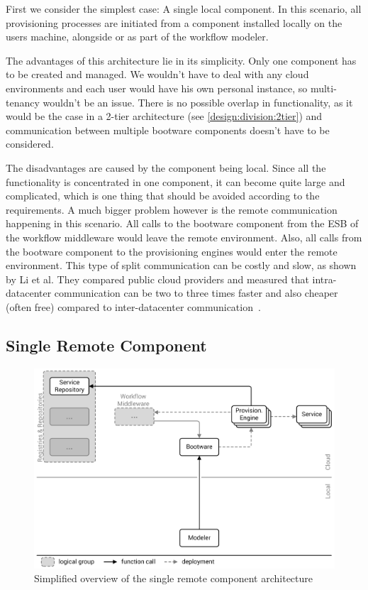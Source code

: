 First we consider the simplest case: A single local component.
In this scenario, all provisioning processes are initiated from a component installed locally on the users machine, alongside or as part of the workflow modeler.

The advantages of this architecture lie in its simplicity.
Only one component has to be created and managed.
We wouldn't have to deal with any cloud environments and each user would have his own personal instance, so multi-tenancy wouldn't be an issue.
There is no possible overlap in functionality, as it would be the case in a 2-tier architecture (see \autoref{design:division:2tier}) and communication between multiple bootware components doesn't have to be considered.

The disadvantages are caused by the component being local.
Since all the functionality is concentrated in one component, it can become quite large and complicated, which is one thing that should be avoided according to the requirements.
A much bigger problem however is the remote communication happening in this scenario.
All calls to the bootware component from the ESB of the workflow middleware would leave the remote environment.
Also, all calls from the bootware component to the provisioning engines would enter the remote environment.
This type of split communication can be costly and slow, as shown by Li et al.
They compared public cloud providers and measured that intra-datacenter communication can be two to three times faster and also cheaper (often free) compared to inter-datacenter communication~\autocite{cloudcmp}.

\subsection{Single Remote Component}

\begin{figure}[!htbp]
	\centering
	\includegraphics[resolution=600]{design/assets/simple_remote}
	\caption{Simplified overview of the single remote component architecture}
	\label{image:single_remote}
\end{figure}

